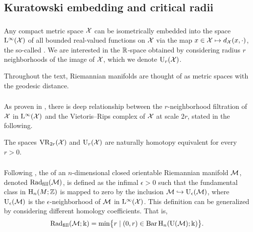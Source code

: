 

\subsection{Kuratowski embedding and critical radii}\label{sub:filling radii}

\subsubsection{}

Any compact metric space $\cX$ can be isometrically embedded into the space $\rL^\infty(\cX)$ of all bounded real-valued functions on $\cX$ via the map $x \in \cX \mapsto d_\cX(x,\cdot)$, the so-called .
We are interested in the \(\R\)-space obtained by considering radius \(r\) neighborhoods of the image of \(\cX\), which we denote \(\rU_r(\cX)\).

Throughout the text, Riemannian manifolds are thought of as metric spaces with the geodesic distance.

\subsubsection{}\label{ss:kuratowski_vr}

As proven in \cite[Thm.~4.1]{lim2024vietoris}, there is deep relationship between the \(r\)-neighborhood filtration of $\cX$ in $\rL^\infty(\cX)$ and the Vietoris--Rips complex of \(\cX\) at scale \(2r\), stated in the following.

\medskip\lemma The spaces $\VR_{2r}(\cX)$ and $\rU_r(\cX)$ are naturally homotopy equivalent for every \(r > 0\).

\subsubsection{}

Following \cite{gromov1983filling}, the  of an \(n\)-dimensional closed orientable Riemannian manifold $\cM$, denoted \(\fillrad(\cM)\), is defined as the infimal $\epsilon > 0$ such that the fundamental class in $\rH_n(M; \Z)$ is mapped to zero by the inclusion $\cM \hookrightarrow \rU_\epsilon(\cM)$, where \(\rU_\epsilon(\cM)\) is the \(\epsilon\)-neighborhood of \(\cM\) in \(\rL^\infty(\cX)\).
This definition can be generalized by considering different homology coefficients.
That is,
\[
\fillrad(\cM; \field) = \min\set[\big]{r \mid (0, r) \in \barc \rH_n(\rU(\cM); \field)}.
\]

